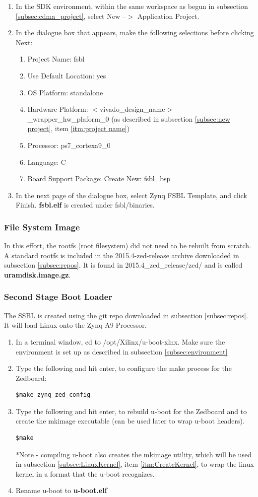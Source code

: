 \documentclass[12pt]{article}
\begin{document}
\begin{enumerate}
\item In the SDK environment, within the same workspace as begun in subsection \ref{subsec:cdma_project}, select New --$>$ Application Project.
\item  In the dialogue box that appears, make the following selections before clicking Next:
\begin{enumerate}
\item Project Name: fsbl
\item Use Default Location: yes
\item OS Platform: standalone
\item Hardware Platform: $<$vivado\_design\_name$>$\_wrapper\_hw\_plaform\_0 (as described in subsection \ref{subsec:new project}, item \ref{itm:project name})
\item Processor: ps7\_cortexa9\_0
\item Language: C
\item Board Support Package: Create New: fsbl\_bsp
\end{enumerate}
\item In the next page of the dialogue box, select Zynq FSBL Template, and click Finish.  \textbf{fsbl.elf} is created under fsbl/binaries.
\end{enumerate}
\subsubsection{File System Image}
In this effort, the rootfs (root filesystem) did not need to be rebuilt from scratch.  A standard rootfs is included in the 2015.4-zed-release archive downloaded in subsection \ref{subsec:repos}.  It is found in 2015.4\_zed\_release/zed/ and is called \textbf{uramdisk.image.gz}.
\subsubsection{Second Stage Boot Loader}
The SSBL is created using the git repo downloaded in subsection \ref{subsec:repos}.  It will load Linux onto the Zynq A9 Processor.
\begin{enumerate}
\item In a terminal window, cd to /opt/Xilinx/u-boot-xlnx.  Make sure the environment is set up as described in subsection \ref{subsec:environment}
\item Type the following and hit enter, to configure the make process for the Zedboard:
\begin{lstlisting}
$make zynq_zed_config
\end{lstlisting}
\item Type the following and hit enter, to rebuild u-boot for the Zedboard and to create the mkimage executable (can be used later to wrap u-boot headers).
\begin{lstlisting}
$make 
\end{lstlisting} 
*Note - compiling u-boot also creates the mkimage utility, which will be used in subsection \ref{subsec:LinuxKernel}, item \ref{itm:CreateKernel}, to wrap the linux kernel in a format that the u-boot recognizes.
\item Rename u-boot to \textbf{u-boot.elf}
\end{enumerate}
\end{document}
